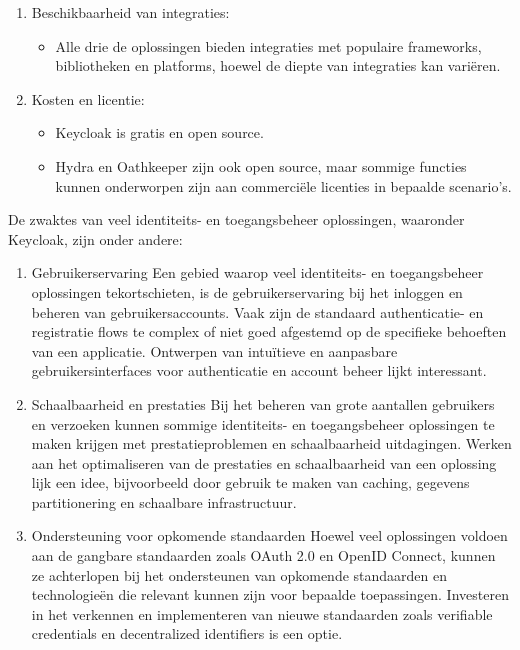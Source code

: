 \begin{enumerate}
  \item Beschikbaarheid van integraties:
  \begin{itemize}
    \item Alle drie de oplossingen bieden integraties met populaire frameworks, bibliotheken en platforms, hoewel de diepte van integraties kan variëren.
  \end{itemize}
  
  \item Kosten en licentie:
  \begin{itemize}
    \item Keycloak is gratis en open source.
    \item Hydra en Oathkeeper zijn ook open source, maar sommige functies kunnen onderworpen zijn aan commerciële licenties in bepaalde scenario's.
  \end{itemize}
\end{enumerate}

De zwaktes van veel identiteits- en toegangsbeheer oplossingen, waaronder Keycloak, zijn onder andere:

\begin{enumerate}
  \item Gebruikerservaring
  Een gebied waarop veel identiteits- en toegangsbeheer oplossingen tekortschieten, is de gebruikerservaring bij het inloggen en beheren van gebruikersaccounts. Vaak zijn de standaard authenticatie- en registratie flows te complex of niet goed afgestemd op de specifieke behoeften van een applicatie. Ontwerpen van intuïtieve en aanpasbare gebruikersinterfaces voor authenticatie en account beheer lijkt interessant.
  
  \item Schaalbaarheid en prestaties
  Bij het beheren van grote aantallen gebruikers en verzoeken kunnen sommige identiteits- en toegangsbeheer oplossingen te maken krijgen met prestatieproblemen en schaalbaarheid uitdagingen. Werken aan het optimaliseren van de prestaties en schaalbaarheid van een oplossing lijk een idee, bijvoorbeeld door gebruik te maken van caching, gegevens partitionering en schaalbare infrastructuur.
  
  \item Ondersteuning voor opkomende standaarden
  Hoewel veel oplossingen voldoen aan de gangbare standaarden zoals OAuth 2.0 en OpenID Connect, kunnen ze achterlopen bij het ondersteunen van opkomende standaarden en technologieën die relevant kunnen zijn voor bepaalde toepassingen. Investeren in het verkennen en implementeren van nieuwe standaarden zoals verifiable credentials en decentralized identifiers is een optie.
\end{enumerate}

